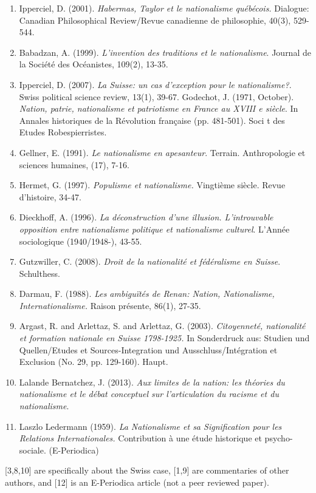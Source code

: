 \documentclass[11pt]{article}
\begin{document}
\begin{enumerate}
    \item Ipperciel, D. (2001). \textit{Habermas, Taylor et le nationalisme québécois. }Dialogue: Canadian Philosophical Review/Revue canadienne de philosophie, 40(3), 529-544.
    \item Babadzan, A. (1999). \textit{L'invention des traditions et le nationalisme}. Journal de la Société des Océanistes, 109(2), 13-35.
    \item Ipperciel, D. (2007). \textit{La Suisse: un cas d'exception pour le nationalisme?}. Swiss political science review, 13(1), 39-67. Godechot, J. (1971, October). \textit{Nation, patrie, nationalisme et patriotisme en France au XVIII e siècle}. In Annales historiques de la Révolution française (pp. 481-501). Soci t des Etudes Robespierristes.
    \item Gellner, E. (1991).\textit{ Le nationalisme en apesanteur}. Terrain. Anthropologie et sciences humaines, (17), 7-16.
    \item Hermet, G. (1997).\textit{ Populisme et nationalisme.} Vingtième siècle. Revue d'histoire, 34-47.
    \item Dieckhoff, A. (1996). \textit{La déconstruction d'une illusion. L'introuvable opposition entre nationalisme politique et nationalisme culturel}. L'Année sociologique (1940/1948-), 43-55.
    \item Gutzwiller, C. (2008). \textit{Droit de la nationalité et fédéralisme en Suisse}. Schulthess.
    \item Darmau, F. (1988). \textit{Les ambiguïtés de Renan: Nation, Nationalisme, Internationalisme.} Raison présente, 86(1), 27-35.
    \item Argast, R. and Arlettaz, S. and Arlettaz, G. (2003). \textit{Citoyenneté, nationalité et formation nationale en Suisse 1798-1925.} In Sonderdruck aus: Studien und Quellen/Etudes et Sources-Integration und Ausschluss/Intégration et Exclusion (No. 29, pp. 129-160). Haupt.
    \item Lalande Bernatchez, J. (2013). \textit{Aux limites de la nation: les théories du nationalisme et le débat conceptuel sur l'articulation du racisme et du nationalisme}.
    \item Laszlo Ledermann (1959). \textit{La Nationalisme et sa Signification pour les Relations Internationales.} Contribution à une étude historique et psycho-sociale. (E-Periodica)
\end{enumerate}

[3,8,10] are specifically about the Swiss case, [1,9] are commentaries of other authors, and [12] is an E-Periodica article (not a peer reviewed paper).\\
\end{document}
